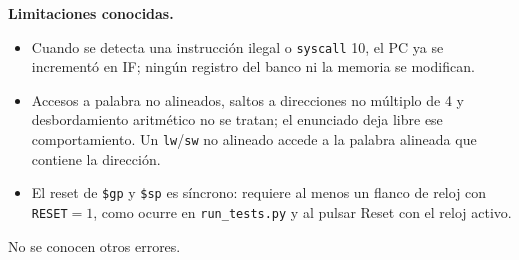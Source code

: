 \documentclass[10pt,a4paper]{article}
\newcommand{\s}[1]{\texttt{#1}}
\begin{document}
\noindent\textbf{Limitaciones conocidas.}
\begin{itemize}
\item Cuando se detecta una instrucción ilegal o \s{syscall} 10, el PC ya se incrementó
en IF; ningún registro del banco ni la memoria se modifican.
\item Accesos a palabra no alineados, saltos a direcciones no múltiplo de 4 y
desbordamiento aritmético no se tratan; el enunciado deja libre ese comportamiento.
Un \s{lw}/\s{sw} no alineado accede a la palabra alineada que contiene la dirección.
\item El reset de \s{\$gp} y \s{\$sp} es síncrono: requiere al menos un flanco de reloj
con \s{RESET}$=1$, como ocurre en \s{run\_tests.py} y al pulsar Reset con el reloj activo.
\end{itemize}
No se conocen otros errores.
\end{document}
